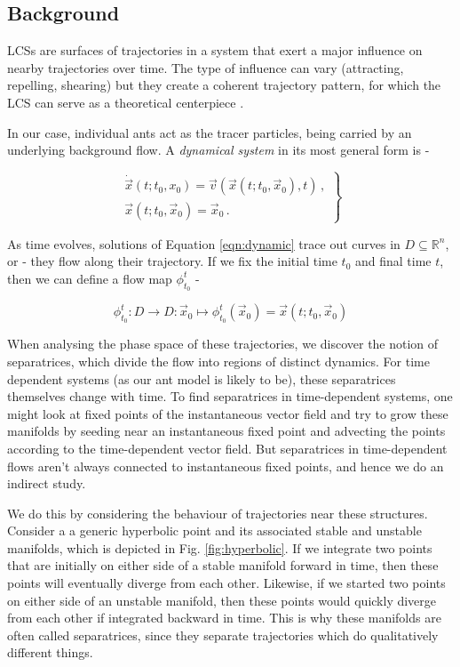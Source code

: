 \subsection{Background}

LCSs are surfaces of trajectories in a system that exert a major influence on nearby trajectories over time. The type of influence can vary (attracting, repelling, shearing) but they create a coherent trajectory pattern, for which the LCS can serve as a theoretical centerpiece \cite{Haller2000}.

In our case, individual ants act as the tracer particles, being carried by an underlying background flow. A \textit{dynamical system} in its most general form is -

\begin{equation}
    \left.
        \begin{array}{l}
            \dot{\vec{x}}(t;t_0,x_0) = \vec{v}(\vec{x}(t;t_0,\vec{x}_0),t) \, ,\\
            \vec{x}(t;t_0,\vec{x}_0) = \vec{x}_0 \, .
        \end{array}
    \right \}
    \label{eqn:dynamic}
\end{equation}

As time evolves, solutions of Equation \ref{eqn:dynamic} trace out curves in $D \subseteq \mathbb{R}^n$, or - they flow along their trajectory. If we fix the initial time $t_0$ and final time $t$, then we can define a flow map $\phi^t_{t_0}$ -

\begin{equation}
    \phi^t_{t_0} : D \rightarrow D : \vec{x}_0 \mapsto \phi^t_{t_0}(\vec{x}_0) = \vec{x}(t;t_0,\vec{x}_0)
\end{equation}

When analysing the phase space of these trajectories, we discover the notion of separatrices, which divide the flow into regions of distinct dynamics. For time dependent systems (as our ant model is likely to be), these separatrices themselves change with time. To find separatrices in time-dependent systems, one might look at fixed points of the instantaneous vector field and try to grow these manifolds by seeding near an instantaneous fixed point and advecting the points according to the time-dependent vector field. But separatrices in time-dependent flows aren't always connected to instantaneous fixed points, and hence we do an indirect study.

We do this by considering the behaviour of trajectories near these structures. Consider a a generic hyperbolic point and its associated stable and unstable manifolds, which is depicted in Fig. \ref{fig:hyperbolic}. If we integrate two points that are initially on either side of a stable manifold forward in time, then these points will eventually diverge from each other. Likewise, if we started two points on either side of an unstable manifold, then these points would quickly diverge from each other if integrated backward in time. This is why these manifolds are often called separatrices, since they separate trajectories which do qualitatively different things.

